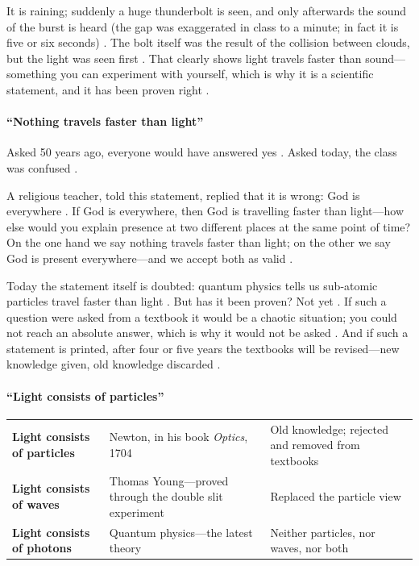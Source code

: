 \begin{ExampleBox}
It is raining; suddenly a huge thunderbolt is seen, and only afterwards the sound of the burst is heard (the gap was exaggerated in class to a minute; in fact it is five or six seconds) . The bolt itself was the result of the collision between clouds, but the light was seen first . That clearly shows light travels faster than sound---something you can experiment with yourself, which is why it is a scientific statement, and it has been proven right .
\end{ExampleBox}

\paragraph{``Nothing travels faster than light''}
Asked 50 years ago, everyone would have answered yes . Asked today, the class was confused .

\begin{ExampleBox}
A religious teacher, told this statement, replied that it is wrong: God is everywhere . If God is everywhere, then God is travelling faster than light---how else would you explain presence at two different places at the same point of time?  On the one hand we say nothing travels faster than light; on the other we say God is present everywhere---and we accept both as valid .
\end{ExampleBox}

Today the statement itself is doubted: quantum physics tells us sub-atomic particles travel faster than light . But has it been proven? Not yet . If such a question were asked from a textbook it would be a chaotic situation; you could not reach an absolute answer, which is why it would not be asked . And if such a statement is printed, after four or five years the textbooks will be revised---new knowledge given, old knowledge discarded .

\paragraph{``Light consists of particles''}

\vspace{6pt}
\noindent
\begin{tabularx}{\textwidth}{p{3.5cm} p{4.5cm} Y}
\toprule
{}
 &  &  \\
\midrule
\textbf{Light consists of particles} & Newton, in his book \textit{Optics}, 1704 & Old knowledge; rejected and removed from textbooks  \\
\textbf{Light consists of waves} & Thomas Young---proved through the double slit experiment & Replaced the particle view  \\
\textbf{Light consists of photons} & Quantum physics---the latest theory & Neither particles, nor waves, nor both  \\
\bottomrule
\end{tabularx}
\vspace{6pt}

